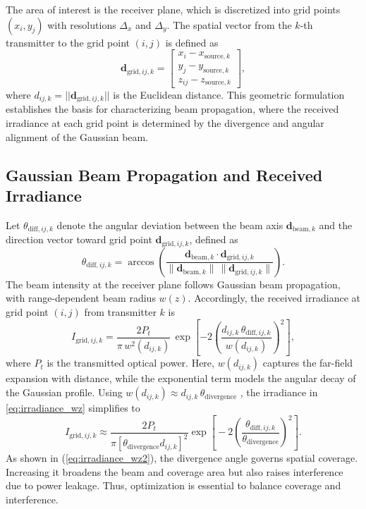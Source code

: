 \documentclass[twocolumn,twoside]{IEEEtran}
\theoremstyle{break}
\begin{document}
	The area of interest is the receiver plane, which is discretized into grid points $(x_i, y_j)$ with resolutions $\Delta_x$ and $\Delta_y$. The spatial vector from the $k$-th transmitter to the grid point $(i, j)$ is defined as
	\begin{equation}
		\mathbf{d}_{\text{grid}, ij, k}=\begin{bmatrix} x_{i}-x_{\text{source}, k} \\ y_{j}-y_{\text{source}, k} \\ z_{ij}-z_{\text{source}, k} \end{bmatrix},
	\end{equation}
	where $d_{ij, k} = ||\mathbf{d}_{\text{grid}, ij, k}||$ is the Euclidean distance. This geometric formulation establishes the basis for characterizing beam propagation, where the received irradiance at each grid point is determined by the divergence and angular alignment of the Gaussian beam.
	\vspace{-3mm}
	
		\subsection{Gaussian Beam Propagation and Received Irradiance}
	Let $\theta_{\text{diff},ij,k}$ denote the angular deviation between the beam axis $\mathbf{d}_{\text{beam},k}$ and the direction vector toward grid point $\mathbf{d}_{\text{grid},ij,k}$, defined as
	\begin{equation}
		\theta_{\text{diff},ij,k}
		= \arccos\!\left(
		\frac{\mathbf{d}_{\text{beam},k}\!\cdot\!\mathbf{d}_{\text{grid},ij,k}}
		{\|\mathbf{d}_{\text{beam},k}\|\,\|\mathbf{d}_{\text{grid},ij,k}\|}
		\right).
	\end{equation}
	The beam intensity at the receiver plane follows Gaussian beam propagation, with range-dependent beam radius
	$w(z)$. Accordingly, the received irradiance at grid point $(i,j)$ from transmitter $k$ is
	\begin{equation}
		\label{eq:irradiance_wz}
		I_{\text{grid},ij,k}
		= \frac{2P_t}{\pi\,w^2(d_{ij,k})}\,
		\exp\!\left[
		-2\left(\frac{d_{ij,k}\,\theta_{\text{diff},ij,k}}{w(d_{ij,k})}\right)^{\!2}
		\right],
	\end{equation}
	where $P_t$ is the transmitted optical power.  Here, $w(d_{ij,k})$ captures the far-field expansion with distance, while the exponential term models the angular decay of the Gaussian profile. Using $w(d_{ij,k})\!\approx\! d_{ij,k}\,\theta_{\text{divergence}}$ \cite{VCSEL1}, the irradiance in \eqref{eq:irradiance_wz} simplifies to
	\begin{equation}
		\label{eq:irradiance_wz2}
		I_{\text{grid},ij,k}
		\!\approx\! \frac{2P_t}{\pi[\theta_{\text{divergence}}d_{ij,k}]^{2}}
		\exp\!\left[\!-\!2\left(\frac{\theta_{\text{diff},ij,k}}{\theta_{\text{divergence}}}\right)^{\!2}\right]\!.
	\end{equation}
	As shown in (\ref{eq:irradiance_wz2}), the divergence angle governs spatial coverage. Increasing it broadens the beam and coverage area but also raises interference due to power leakage. Thus, optimization is essential to balance coverage and interference.
	
\end{document}
